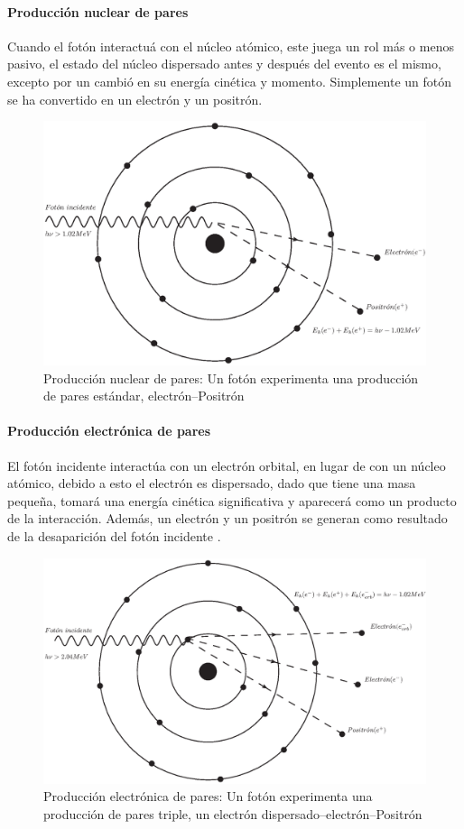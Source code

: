 \paragraph{Producción nuclear de pares}
 Cuando el fotón interactuá con el núcleo atómico, este juega un rol más o menos pasivo, el estado del núcleo dispersado antes y después del evento es el mismo, excepto por un cambió en su energía cinética y momento. Simplemente un fotón se ha convertido en un electrón y un positrón\cite{Edward}.
\begin{figure}[htbp]
    \centering
    \includegraphics[width=.68\linewidth]{./Figures/nuclearpp.eps}
    \caption[Producción nuclear de pares]{Producción nuclear de pares: Un fotón experimenta una producción de pares estándar, electrón--Positrón}
    \label{fig:PN}
\end{figure}
\paragraph{Producción electrónica de pares}
 El fotón incidente interactúa con un electrón orbital, en lugar de con un núcleo atómico, debido a esto el electrón es dispersado, dado que tiene una masa pequeña, tomará una energía cinética significativa y aparecerá como un producto de la interacción. Además, un electrón y un positrón se generan como resultado de la desaparición del fotón incidente \cite{Edward}.
\begin{figure}[htbp]
    \centering
    \includegraphics[width=.68\linewidth]{./Figures/electpp.eps}
    \caption[Producción electrónica de pares]{Producción electrónica de pares: Un fotón experimenta una producción de pares triple, un electrón dispersado--electrón--Positrón}
    \label{fig:PE}
\end{figure}

